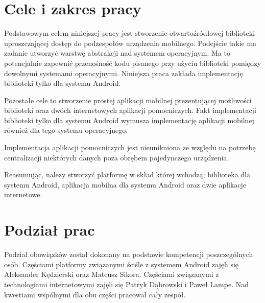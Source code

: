 \documentclass[11pt,a4paper,polish,thesis]{dcsbook}
\begin{document}
\section{Cele i zakres pracy}
Podstawowym celem niniejszej pracy jest stworzenie otwartoźródłowej biblioteki uproszczającej dostęp do podzespołów urządzenia mobilnego. Podejście takie ma zadanie
utworzyć warstwę abstrakcji nad systemem operacyjnym. Ma to potencjalnie zapewnić przenośność kodu pisanego przy użyciu biblioteki pomiędzy dowolnymi systemami
operacyjnymi. Niniejsza praca zakłada implementację biblioteki tylko dla systemu Android.

Pozostałe cele to stworzenie prostej aplikacji mobilnej prezentującej możliwości biblioteki oraz dwóch internetowych aplikacji pomocniczych. Fakt implementacji
biblioteki tylko dla systemu Android wymusza implementację aplikacji mobilnej również dla tego systemu operacyjnego.

Implementacja aplikacji pomocniczych jest nieunikniona ze względu na potrzebę centralizacji niektórych danych poza obrębem pojedynczego urządzenia.

Reasumując, należy stworzyć platformę w skład której wchodzą; biblioteka dla systemu Android, aplikacja mobilna dla systemu Android oraz dwie aplikacje internetowe.
\section{Podział prac}
Podział obowiązków został dokonany na podstawie kompetencji poszczególnych osób. Częściami platformy związanymi ściśle z systemem Android zajęli się Aleksander
Kędzierski oraz Mateusz Sikora. Częściami związanymi z technologiami internetowymi zajęli się Patryk Dąbrowski i Paweł Lampe. Nad kwestiami wspólnymi dla obu części
pracował cały zespół.
\end{document}
